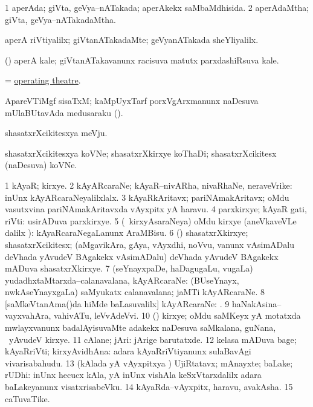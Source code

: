 \bentry
{}
\gl{\gu}
\bmng
\bnum
\num{1} aperAda; giVta, geVya--nATakada; aperAkekx saMbaMdhisida. 
\num{2} aperAdaMtha; giVta, geVya--nATakadaMtha. 
\enum
\emng
\eentry

\bentry
{}
\gl{\kirxvi}
\bmng
aperA riVtiyalilx; giVtanATakadaMte; geVyanATakada sheYliyalilx. 
\emng
\eentry

\bentry
{}
\gl{\nA}
\bmng
(\bava) aperA kale; giVtanATakavanunx racisuva matutx parxdashiRsuva kale. 
\emng
\eentry

\bentry
{}
\gl{\nA}
\bmng
= \hyperlink{operating theatre}{operating theatre}. 
\emng
\eentry

\bentry
{}
\gl{\nA}
\bmng
ApareVTiMgf sisaTxM; kaMpUyxTarf porxVgArxmanunx naDesuva mUlaBUtavAda medusaraku (). 
\emng
\eentry

\bentry
{}
\gl{\nA}
\bmng
shasatxrXcikitesxya meVju. 
\emng
\eentry

\bentry
{}
\gl{\nA}
\bmng
shasatxrXcikitesxya koVNe; shasatxrXkirxye koThaDi; shasatxrXcikitesx (naDesuva) koVNe. 
\emng
\eentry

\bentry
{}
\gl{\nA}
\bmng
\bnum
\num{1} kAyaR; kirxye. 
\num{2} kAyARcaraNe; kAyaR--nivARha, nivaRhaNe, neraveVrike:  inUnx kAyARcaraNeyalilxlalx. 
\num{3} kAyaRkAritavx; pariNAmakAritavx; oMdu vasutxvina pariNAmakAritavxda vAyxpitx yA haravu. 
\num{4} parxkirxye; kAyaR gati, riVti:  usirADuva parxkirxye. 
\num{5} (\kanmu\ kirxyAsaraNeya) oMdu kirxye (aneVkaveVLe \bava dalilx \parx):  kAyaRcaraNegaLanunx AraMBisu. 
\num{6} (\shaveY) shasatxrXkirxye; shasatxrXcikitesx; (aMgavikAra, gAya, vAyxdhi, noVvu, \mo vanunx vAsimADalu deVhada yAvudeV BAgakekx vAsimADalu) deVhada yAvudeV BAgakekx mADuva shasatxrXkirxye. 
\num{7} (seYnayxpaDe, haDagugaLu, \mo vugaLa) yudadhxtaMtarxda--calanavalana, kAyARcaraNe:  (BUseYnayx, nwkAseYnayxgaLa) saMyukatx calanavalana; jaMTi kAyARcaraNe. 
\num{8} [saMkeVtanAma()da hiMde baLasuvalilx] kAyARcaraNe: . 
\num{9} haNakAsina--vayxvahAra, vahivATu, leVvAdeVvi. 
\num{10} (\ga) kirxye; oMdu saMKeyx yA motatxda mwlayxvanunx badalAyisuvaMte adakekx naDesuva saMkalana, guNana, \mo\ yAvudeV kirxye. 
\num{11} cAlane; jAri:  jArige barutatxde. 
\num{12} kelasa mADuva bage; kAyaRriVti; kirxyAvidhAna:  adara kAyaRriVtiyanunx sulaBavAgi vivarisabahudu. 
\num{13} (kAlada yA vAyxpitxya \vi) UjiRtatavx; mAnayxte; baLake; rUDhi:  inUnx hecucx kAla, yA inUnx vishAla keSxVtarxdalilx adara baLakeyanunx visatxrisabeVku. 
\num{14} kAyaRda--vAyxpitx, haravu, avakAsha. 
\num{15} caTuvaTike. 
\enum
\emng
\eentry

